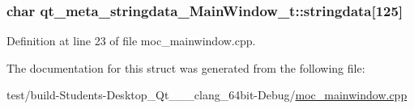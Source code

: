 \hypertarget{structqt__meta__stringdata___main_window__t_a83a4e6119d3600df5ed2ecd99c255853}{}
\subsubsection[{stringdata}]{\setlength{\rightskip}{0pt plus 5cm}char qt\+\_\+meta\+\_\+stringdata\+\_\+\+Main\+Window\+\_\+t\+::stringdata\mbox{[}125\mbox{]}}\label{structqt__meta__stringdata___main_window__t_a83a4e6119d3600df5ed2ecd99c255853}


Definition at line 23 of file moc\+\_\+mainwindow.\+cpp.



The documentation for this struct was generated from the following file\+:\begin{DoxyCompactItemize}
\item 
test/build-\/\+Students-\/\+Desktop\+\_\+\+Qt\+\_\+\_\+\_\+clang\+\_\+64bit-\/\+Debug/\hyperlink{moc__mainwindow_8cpp}{moc\+\_\+mainwindow.\+cpp}\end{DoxyCompactItemize}
